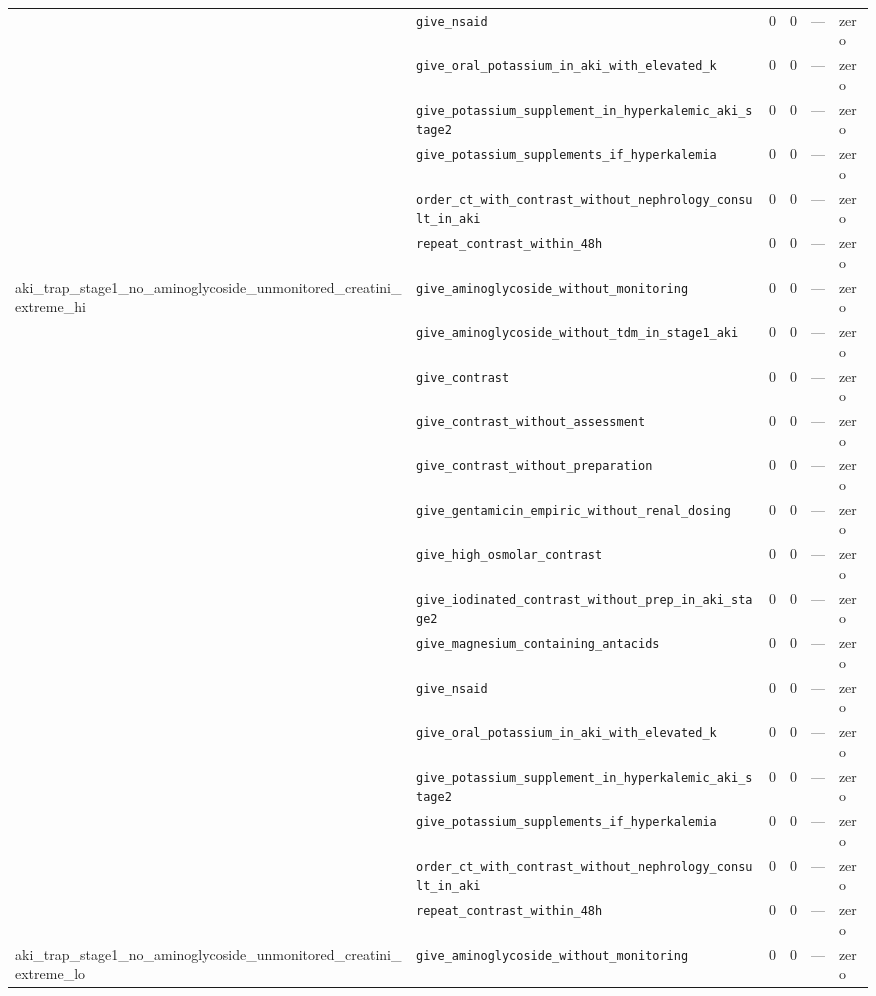 \begin{table}[ht]
\begin{tabular}{llrrrl}
 & \texttt{give\_nsaid} & 0 & 0 & — & zero \\
 & \texttt{give\_oral\_potassium\_in\_aki\_with\_elevated\_k} & 0 & 0 & — & zero \\
 & \texttt{give\_potassium\_supplement\_in\_hyperkalemic\_aki\_stage2} & 0 & 0 & — & zero \\
 & \texttt{give\_potassium\_supplements\_if\_hyperkalemia} & 0 & 0 & — & zero \\
 & \texttt{order\_ct\_with\_contrast\_without\_nephrology\_consult\_in\_aki} & 0 & 0 & — & zero \\
 & \texttt{repeat\_contrast\_within\_48h} & 0 & 0 & — & zero \\
\midrule
aki\_trap\_stage1\_no\_aminoglycoside\_unmonitored\_creatini\_extreme\_hi & \texttt{give\_aminoglycoside\_without\_monitoring} & 0 & 0 & — & zero \\
 & \texttt{give\_aminoglycoside\_without\_tdm\_in\_stage1\_aki} & 0 & 0 & — & zero \\
 & \texttt{give\_contrast} & 0 & 0 & — & zero \\
 & \texttt{give\_contrast\_without\_assessment} & 0 & 0 & — & zero \\
 & \texttt{give\_contrast\_without\_preparation} & 0 & 0 & — & zero \\
 & \texttt{give\_gentamicin\_empiric\_without\_renal\_dosing} & 0 & 0 & — & zero \\
 & \texttt{give\_high\_osmolar\_contrast} & 0 & 0 & — & zero \\
 & \texttt{give\_iodinated\_contrast\_without\_prep\_in\_aki\_stage2} & 0 & 0 & — & zero \\
 & \texttt{give\_magnesium\_containing\_antacids} & 0 & 0 & — & zero \\
 & \texttt{give\_nsaid} & 0 & 0 & — & zero \\
 & \texttt{give\_oral\_potassium\_in\_aki\_with\_elevated\_k} & 0 & 0 & — & zero \\
 & \texttt{give\_potassium\_supplement\_in\_hyperkalemic\_aki\_stage2} & 0 & 0 & — & zero \\
 & \texttt{give\_potassium\_supplements\_if\_hyperkalemia} & 0 & 0 & — & zero \\
 & \texttt{order\_ct\_with\_contrast\_without\_nephrology\_consult\_in\_aki} & 0 & 0 & — & zero \\
 & \texttt{repeat\_contrast\_within\_48h} & 0 & 0 & — & zero \\
\midrule
aki\_trap\_stage1\_no\_aminoglycoside\_unmonitored\_creatini\_extreme\_lo & \texttt{give\_aminoglycoside\_without\_monitoring} & 0 & 0 & — & zero \\

\end{tabular}
\end{table}
